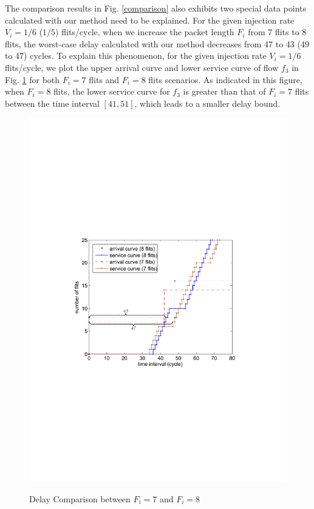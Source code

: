 \documentclass[preprint]{elsarticle}
\begin{document}
The comparison results in Fig. \ref{comparison} also exhibits two special data points calculated with our method need to be explained. For the given injection rate $V_i=1/6$ ($1/5$) flits/cycle, when we increase the packet length $F_i$ from 7 flits to 8 flits, the worst-case delay calculated with our method decreases from 47 to 43 (49 to 47) cycles. To explain this phenomenon, for the given injection rate $V_i=1/6$ flits/cycle, we plot the upper arrival curve and lower service curve of flow $f_3$ in Fig. \ref{reason} for both $F_i=7$ flits and $F_i=8$ flits scenarios. As indicated in this figure, when $F_i=8$ flits, the lower service curve for $f_3$ is greater than that of $F_i=7$ flits between the time interval $[41,51]$, which leads to a smaller delay bound.
\begin{figure}
  \centering
  \includegraphics[scale=0.63]{figures/reason.pdf}\\
  \caption{Delay Comparison between $F_i=7$ and $F_i=8$}\label{reason}
\end{figure}
\end{document}
